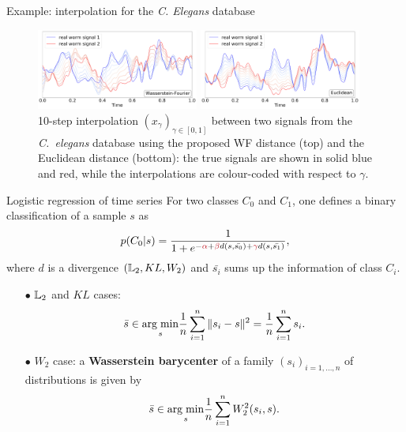 \documentclass[pdf,aspectratio=169,10pt]{beamer}
\begin{document}
\begin{frame}{Example: interpolation for the \emph{C. Elegans} database}
\begin{figure}
\centering
\includegraphics[width=0.475\textwidth]{../img/worms_geodesic_sameclass.pdf}
\includegraphics[width=0.475\textwidth]{../img/worms_euclidean_sameclass.pdf}
  {10-step interpolation $(x_{\gamma})_{\gamma\in [0,1]}$ between two signals from the {\em C.~elegans} database using the proposed WF distance (top) and the Euclidean distance (bottom): the true signals are shown in solid blue and red, while the interpolations are colour-coded with respect to $\gamma$.}
\end{figure}
\end{frame}




\begin{frame}{Logistic regression of time series}
For two classes $C_0$ and $C_1$, one defines a binary classification of a sample $s$ as
$$p(C_0\vert s)=\frac{1}{1+e^{-\red{\alpha}+\red{\beta} d(s,\bar{s_0})+\red{\gamma} d(s,\bar{s_1})}},$$
where $d$ is a divergence $({\mathbb L}_2, KL, W_2)$ and $\bar{s_i}$ sums up the information of class $C_i$.

\begin{itemize}
\item[$\bullet$] ${\mathbb L}_2$ and $KL$ cases:
$$\bar{s}\in \underset{s}{\mathop{\rm arg \; min}\limits}\frac{1}{n}\sum_{i=1}^n\Vert s_i-s\Vert^2=\frac{1}{n}\sum_{i=1}^n s_i.$$
\item[$\bullet$] $W_2$ case: a \textbf{Wasserstein barycenter} of a family $(s_i)_{i=1,\ldots,n}$ of distributions is given by
$$\bar{s}\in \underset{s}{\mathop{\rm arg \; min}\limits}\frac{1}{n}\sum_{i=1}^nW_2^2(s_i,s).$$
\end{itemize}
\end{frame}
\end{document}
